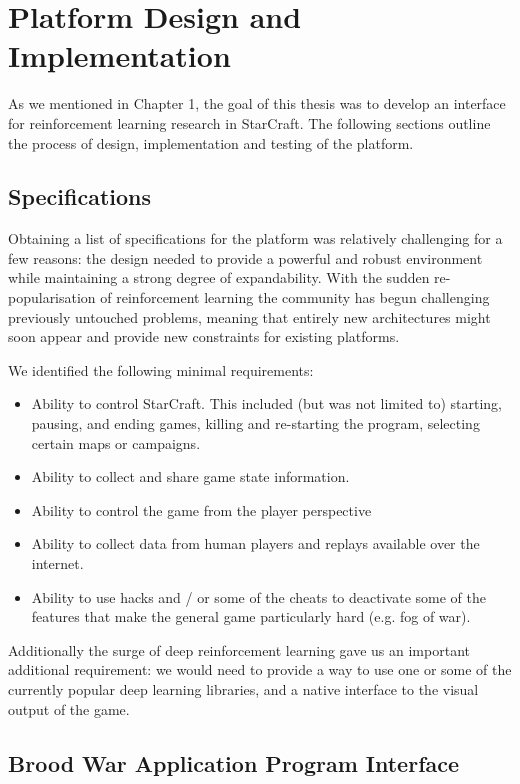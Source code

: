 \chapter{Platform Design and Implementation}

As we mentioned in Chapter 1, the goal of this thesis was to develop an
interface for reinforcement learning research in StarCraft. The following
sections outline the process of design, implementation and testing of the
platform.

\section{Specifications}

Obtaining a list of specifications for the platform was relatively challenging
for a few reasons: the design needed to provide a powerful and robust
environment while maintaining a strong degree of expandability. With the sudden
re-popularisation of reinforcement learning the community has begun challenging
previously untouched problems, meaning that entirely new architectures might
soon appear and provide new constraints for existing platforms.

We identified the following minimal requirements:

\begin{itemize}
\item Ability to control StarCraft. This included (but was not limited to)
  starting, pausing, and ending games, killing and re-starting the program,
  selecting certain maps or campaigns.
\item Ability to collect and share game state information.
\item Ability to control the game from the player perspective
\item Ability to collect data from human players and replays available over the
  internet.
\item Ability to use hacks and / or some of the cheats to deactivate some of the
  features that make the general game particularly hard (e.g. fog of war).
\end{itemize}

Additionally the surge of deep reinforcement learning gave us an important
additional requirement: we would need to provide a way to use one or some of the
currently popular deep learning libraries, and a native interface to the visual
output of the game.

\section{Brood War Application Program Interface}

